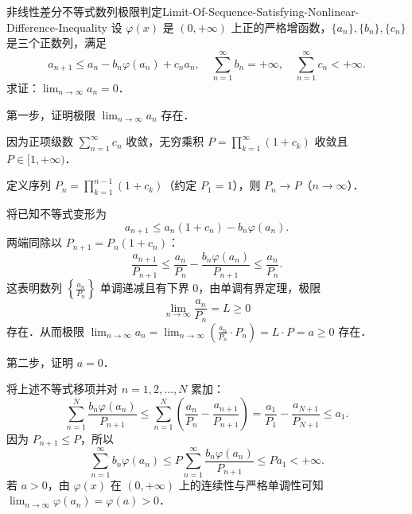 \begin{problem}{非线性差分不等式数列极限判定}{Limit-Of-Sequence-Satisfying-Nonlinear-Difference-Inequality}
    设 $\varphi(x)$ 是 $(0, +\infty)$ 上正的严格增函数，$\{a_n\}, \{b_n\}, \{c_n\}$ 是三个正数列，满足
    \begin{equation}
        a_{n+1} \leqslant a_n - b_n\varphi(a_n) + c_n a_n, \quad \sum_{n=1}^\infty b_n = +\infty, \quad \sum_{n=1}^\infty c_n < +\infty.
    \end{equation}
    求证：$\lim_{n\to\infty} a_n = 0$．
\end{problem}

\begin{myproof}
    第一步，证明极限 $\lim_{n\to\infty} a_n$ 存在．

    因为正项级数 $\sum_{n=1}^\infty c_n$ 收敛，无穷乘积 $P = \prod_{k=1}^\infty (1 + c_k)$ 收敛且 $P \in [1, +\infty)$．

    定义序列 $P_n = \prod_{k=1}^{n-1} (1 + c_k)$（约定 $P_1 = 1$），则 $P_n \to P$（$n \to \infty$）．

    将已知不等式变形为
    \begin{equation}
        a_{n+1} \leqslant a_n(1 + c_n) - b_n\varphi(a_n).
    \end{equation}
    两端同除以 $P_{n+1} = P_n(1 + c_n)$：
    \begin{equation}
        \frac{a_{n+1}}{P_{n+1}} \leqslant \frac{a_n}{P_n} - \frac{b_n\varphi(a_n)}{P_{n+1}} \leqslant \frac{a_n}{P_n}.
    \end{equation}
    这表明数列 $\left\{ \frac{a_n}{P_n} \right\}$ 单调递减且有下界 $0$，由单调有界定理，极限
    \begin{equation}
        \lim_{n\to\infty} \frac{a_n}{P_n} = L \geqslant 0
    \end{equation}
    存在．从而极限 $\lim_{n\to\infty} a_n = \lim_{n\to\infty} \left( \frac{a_n}{P_n} \cdot P_n \right) = L \cdot P = a \geqslant 0$ 存在．

    第二步，证明 $a = 0$．

    将上述不等式移项并对 $n = 1, 2, \dots, N$ 累加：
    \begin{equation}
        \sum_{n=1}^N \frac{b_n\varphi(a_n)}{P_{n+1}} \leqslant \sum_{n=1}^N \left( \frac{a_n}{P_n} - \frac{a_{n+1}}{P_{n+1}} \right) = \frac{a_1}{P_1} - \frac{a_{N+1}}{P_{N+1}} \leqslant a_1.
    \end{equation}
    因为 $P_{n+1} \leqslant P$，所以
    \begin{equation}
        \sum_{n=1}^\infty b_n\varphi(a_n) \leqslant P \sum_{n=1}^\infty \frac{b_n\varphi(a_n)}{P_{n+1}} \leqslant P a_1 < +\infty.
    \end{equation}
    若 $a > 0$，由 $\varphi(x)$ 在 $(0, +\infty)$ 上的连续性与严格单调性可知 $\lim_{n\to\infty}\varphi(a_n) = \varphi(a) > 0$．


\end{myproof}
